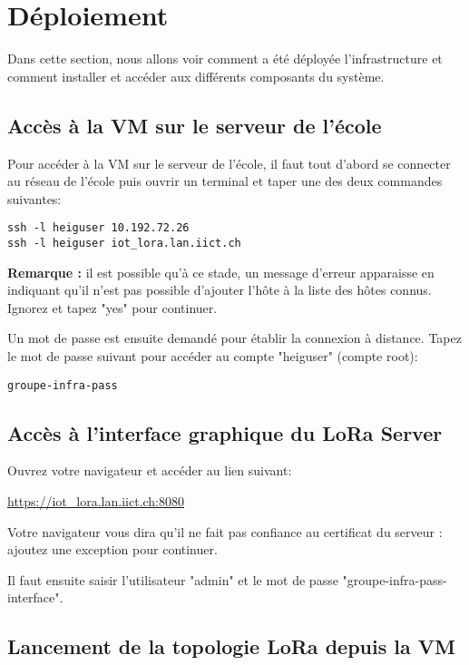 \clearpage
\section{Déploiement}

Dans cette section, nous allons voir comment a été déployée l'infrastructure et comment installer et accéder aux différents composants du système.

\subsection{Accès à la VM sur le serveur de l'école}

Pour accéder à la VM sur le serveur de l'école, il faut tout d'abord se connecter au réseau de l'école puis ouvrir un terminal et taper une des deux commandes suivantes:

\begin{verbatim}
ssh -l heiguser 10.192.72.26
ssh -l heiguser iot_lora.lan.iict.ch
\end{verbatim}

\textbf{Remarque :} il est possible qu'à ce stade, un message d'erreur apparaisse en indiquant qu'il n'est pas possible d'ajouter l'hôte à la liste des hôtes connus. Ignorez et tapez "yes" pour continuer.

Un mot de passe est ensuite demandé pour établir la connexion à distance. Tapez le mot de passe suivant pour accéder au compte "heiguser" (compte root):

\texttt{groupe-infra-pass}

\subsection{Accès à l'interface graphique du LoRa Server}

Ouvrez votre navigateur et accéder au lien suivant:

\url{https://iot_lora.lan.iict.ch:8080}

Votre navigateur vous dira qu'il ne fait pas confiance au certificat du serveur : ajoutez une exception pour continuer.

Il faut ensuite saisir l'utilisateur "admin" et le mot de passe "groupe-infra-pass-interface".

\subsection{Lancement de la topologie LoRa depuis la VM}

